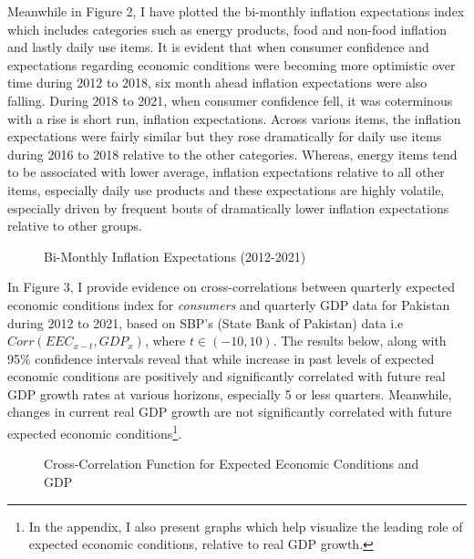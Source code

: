 \documentclass[12pt]{article}
\newcommand{\1}{\mathbbm 1}
\begin{document}
	Meanwhile in Figure 2, I have plotted the bi-monthly inflation expectations index which includes categories such as energy products, food and non-food inflation and lastly daily use items. It is evident that when consumer confidence and expectations regarding economic conditions were becoming more optimistic over time during 2012 to 2018, six month ahead inflation expectations were also falling. During 2018 to 2021, when consumer confidence fell, it was coterminous with a rise is short run, inflation expectations. Across various items, the inflation expectations were fairly similar but they rose dramatically for daily use items during 2016 to 2018 relative to the other categories. Whereas, energy items tend to be associated with lower average, inflation expectations relative to all other items, especially daily use products and these expectations are highly volatile, especially driven by frequent bouts of dramatically lower inflation expectations relative to other groups.

		
		
		
		
		
		\begin{figure}[H]
			\centering
			\scalebox{0.8}{}
			\caption[]{Bi-Monthly Inflation Expectations (2012-2021)}
		\end{figure}
	
	
	In Figure 3, I provide evidence on cross-correlations between quarterly expected economic conditions index for \textit{consumers} and quarterly GDP data for Pakistan during 2012 to 2021, based on SBP's (State Bank of Pakistan) data i.e $Corr(EEC_{x-t}, GDP_{x})$, where $t \in (-10,10)$. The results below, along with 95\% confidence intervals reveal that while increase in past levels of expected economic conditions are positively and significantly correlated with future real GDP growth rates at various horizons, especially 5 or less quarters. Meanwhile, changes in current real GDP growth are not significantly correlated with future expected economic conditions\footnote{In the appendix, I also present graphs which help visualize the leading role of expected economic conditions, relative to real GDP growth.}.
		
		
	\begin{figure}[H]
		\centering
		\scalebox{0.8}{}
		\caption[]{Cross-Correlation Function for Expected Economic Conditions and GDP}
	\end{figure}
\end{document}
